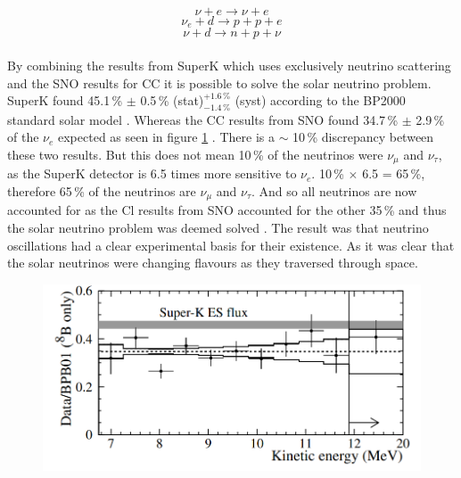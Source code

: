 \begin{equation}
    \nu + e \rightarrow  \nu + e
    \label{neutrino_scattering}
\end{equation}
\begin{equation}
    \nu_e + d \rightarrow p + p + e 
    \label{charged-current_reaction}
\end{equation}
\begin{equation}
    \nu + d \rightarrow  n + p + \nu
    \label{neutral-current_reaction}
\end{equation}
\\By combining the results from SuperK which uses exclusively neutrino scattering and the SNO results for CC it is possible to solve the solar neutrino problem. SuperK found 45.1\,\% $\pm$ 0.5\,\% (stat)$^{+1.6\,\%}_{-1.4\,\%}$ (syst) according to the BP2000 standard solar model \cite{superK2001}. Whereas the CC results from SNO found 34.7\,\% $\pm$ 2.9\,\% of the $\nu_e$ expected as seen in figure \ref{sno_superK_comparision_plot} \cite{sno2001}. There is a $\sim$ 10\,\% discrepancy between these two results. But this does not mean 10\,\% of the neutrinos were $\nu_\mu$ and $\nu_\tau$, as the SuperK detector is 6.5 times more sensitive to $\nu_e$. 10\,\% $\times$ 6.5 = 65\,\%, therefore 65\,\% of the neutrinos are $\nu_\mu$ and $\nu_\tau$. And so all neutrinos are now accounted for as the Cl results from SNO accounted for the other 35\,\% and thus the solar neutrino problem was deemed solved \cite{griffiths2008book} \cite{griffiths2008neutrinoOscillations}. The result was that neutrino oscillations had a clear experimental basis for their existence. As it was clear that the solar neutrinos were changing flavours as they traversed through space. 


\begin{figure}[!h]
 \centering
 \includegraphics[width=0.7\linewidth]{Chapter1/Figs/Raster/superKSnoComparison.png} %
 \label{sno_superK_comparision_plot}
\end{figure}


